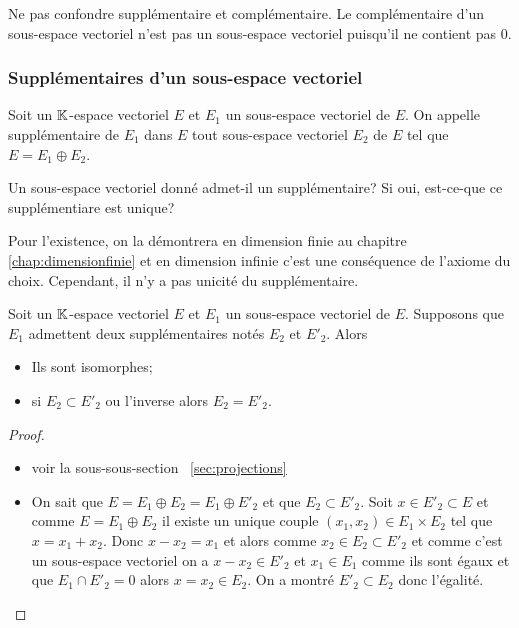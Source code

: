 Ne pas confondre supplémentaire et complémentaire. Le complémentaire d'un sous-espace vectoriel n'est pas un sous-espace vectoriel puisqu'il ne contient pas \(0\).

\subsubsection{Supplémentaires d'un sous-espace vectoriel}

\begin{defdef}
  Soit un \(\mathbb{K}\)-espace vectoriel \(E\) et \(E_1\) un sous-espace vectoriel de \(E\). On appelle supplémentaire de \(E_1\) dans \(E\) tout sous-espace vectoriel \(E_2\) de \(E\) tel que \(E= E_1 \oplus E_2\).
\end{defdef}

Un sous-espace vectoriel donné admet-il un supplémentaire? Si oui, est-ce-que ce supplémentiare est unique?

Pour l'existence, on la démontrera en dimension finie au chapitre~
\ref{chap:dimensionfinie} et en dimension infinie c'est une conséquence de l'axiome du choix. Cependant, il n'y a pas unicité du supplémentaire.

\begin{prop}\label{prop:deuxsuppiso}
  Soit un \(\mathbb{K}\)-espace vectoriel \(E\) et \(E_1\) un sous-espace vectoriel de \(E\). Supposons que \(E_1\) admettent deux supplémentaires notés \(E_2\) et \(E'_2\). Alors
  \begin{itemize}
    \item Ils sont isomorphes;
    \item si \(E_2 \subset E'_2\) ou l'inverse alors \(E_2=E'_2\).
  \end{itemize}
\end{prop}
\begin{proof}
  \begin{itemize}
    \item voir la sous-sous-section~
      \ref{sec:projections}
    \item On sait que \(E=E_1 \oplus E_2=E_1 \oplus E'_2\) et que \(E_2 \subset E'_2\). Soit \(x \in E'_2 \subset E\) et comme \(E=E_1 \oplus E_2\) il existe un unique couple \((x_1,x_2 ) \in E_1 \times E_2\) tel que \(x=x_1+x_2\). Donc \(x-x_2=x_1\) et alors comme \(x_2 \in E_2 \subset E'_2\) et comme c'est un sous-espace vectoriel on a \(x-x_2\in E'_2\)  et \(x_1 \in E_1\) comme ils sont égaux et que \(E_1 \cap E'_2=0\)  alors \(x=x_2 \in E_2\). On a montré \(E'_2 \subset E_2\) donc l'égalité.
  \end{itemize}
\end{proof}

